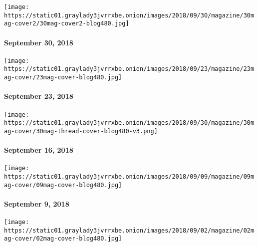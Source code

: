 \href{https://www.nytimes3xbfgragh.onion/issue/magazine/2018/09/28/the-93018-issue}{}

\texttt{[image: https://static01.graylady3jvrrxbe.onion/images/2018/09/30/magazine/30mag-cover2/30mag-cover2-blog480.jpg]}

\hypertarget{september-30-2018}{%
\paragraph{September 30, 2018}\label{september-30-2018}}

\href{https://www.nytimes3xbfgragh.onion/interactive/2018/09/21/magazine/voyages-travel-sounds-from-the-world.html}{}

\texttt{[image: https://static01.graylady3jvrrxbe.onion/images/2018/09/23/magazine/23mag-cover/23mag-cover-blog480.jpg]}

\hypertarget{september-23-2018}{%
\paragraph{September 23, 2018}\label{september-23-2018}}

\href{https://www.nytimes3xbfgragh.onion/issue/magazine/2018/09/24/the-91618-issue}{}

\texttt{[image: https://static01.graylady3jvrrxbe.onion/images/2018/09/30/magazine/30mag-cover/30mag-thread-cover-blog480-v3.png]}

\hypertarget{september-16-2018}{%
\paragraph{September 16, 2018}\label{september-16-2018}}

\href{https://www.nytimes3xbfgragh.onion/issue/magazine/2018/09/06/the-9918-issue}{}

\texttt{[image: https://static01.graylady3jvrrxbe.onion/images/2018/09/09/magazine/09mag-cover/09mag-cover-blog480.jpg]}

\hypertarget{september-9-2018}{%
\paragraph{September 9, 2018}\label{september-9-2018}}

\href{https://www.nytimes3xbfgragh.onion/issue/magazine/2018/09/04/the-9218-issue}{}

\texttt{[image: https://static01.graylady3jvrrxbe.onion/images/2018/09/02/magazine/02mag-cover/02mag-cover-blog480.jpg]}

